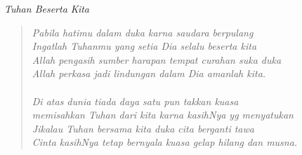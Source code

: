 \begin{center}
\itshape{Tuhan Beserta Kita}
\end{center}

\small
\begin{verse}
\itshape{
Pabila hatimu dalam duka karna saudara berpulang\\
Ingatlah Tuhanmu yang setia Dia selalu beserta kita\\
Allah pengasih sumber harapan tempat curahan suka duka\\
Allah perkasa jadi lindungan dalam Dia amanlah kita.\\
{~}\\
Di atas dunia tiada daya satu pun takkan kuasa\\
memisahkan Tuhan dari kita karna kasihNya yg menyatukan\\
Jikalau Tuhan bersama kita duka cita berganti tawa\\
Cinta kasihNya tetap bernyala kuasa gelap hilang dan musna.\\
}
\end{verse}
\normalsize